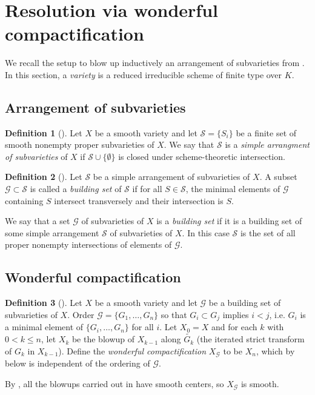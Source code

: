 \documentclass[12pt]{amsart}
\newcommand{\mc}{\mathcal}
\newcommand{\wt}{\widetilde}
\theoremstyle{plain}
\theoremstyle{definition}
\newtheorem{Def}{Definition}[section]
\theoremstyle{remark}
\begin{document}
\section{Resolution via wonderful compactification}
\label{LL}
We recall the setup to blow up inductively an arrangement of subvarieties from \cite{LiLi}. In this section, a \emph{variety} is a reduced irreducible scheme of finite type over $K$.

\subsection{Arrangement of subvarieties}
\begin{Def}
[{\cite[Definition~2.1, Lemma~5.1]{LiLi}}] Let $X$ be a smooth variety and let $\mc{S}=\{S_i\}$ be a finite set of smooth nonempty proper subvarieties of $X$. We say that $\mc{S}$ is a \emph{simple arrangment of subvarieties} of $X$ if $\mc{S} \cup \{\emptyset\}$ is closed under scheme-theoretic intersection.
\end{Def}

\begin{Def}
[{\cite[Definition 2.2]{LiLi}}]
\label{BSD}
Let $\mc{S}$ be a simple arrangement of subvarieties of $X$. A subset $\mc{G}\subset \mc{S}$ is called a \emph{building set} of $\mc{S}$ if for all $S\in \mc{S}$, the minimal elements of $\mc{G}$ containing $S$ intersect transversely and their intersection is $S$. 

We say that a set $\mc{G}$ of subvarieties of $X$ is a \emph{building set} if it is a building set of some simple arrangement $\mc{S}$ of subvarieties of $X$. In this case $\mc{S}$ is the set of all proper nonempty intersections of elements of $\mc{G}$.
\end{Def}

\subsection{Wonderful compactification}

\begin{Def} [{\cite[Definition 2.12]{LiLi}}]
\label{iterBU}
Let $X$ be a smooth variety and let $\mc{G}$ be a building set of subvarieties of $X$. Order $\mc{G}=\{G_1,\ldots,G_n\}$ so that $G_i\subset G_j$ implies $i < j$, i.e. $G_i$ is a minimal element of $\{G_i,\ldots,G_n\}$ for all $i$. Let $X_0 = X$ and for each $k$ with $0 < k \leq n$, let $X_{k}$ be the blowup of $X_{k-1}$ along $\wt{G_k}$ (the iterated strict transform of $G_k$ in $X_{k-1}$). Define the \emph{wonderful compactification} $X_{\mc{G}}$ to be $X_n$, which by  below is independent of the ordering of $\mc{G}$.

By \cite[Proposition 2.8]{LiLi}, all the blowups carried out in  have smooth centers, so $X_{\mc{G}}$ is smooth.


\end{Def}
\end{document}
